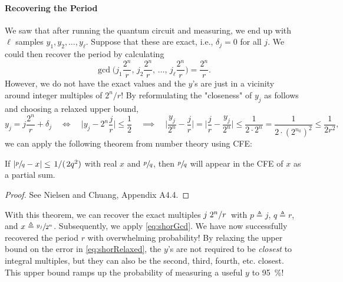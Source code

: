 				\paragraph{Recovering the Period}
					We saw that after running the quantum circuit and measuring, we end up with \(\ell\) samples \( y_1, y_2, \dots, y_\ell \). Suppose that these are exact, i.e., \( \delta_j = 0 \) for all \(j\). We could then recover the period by calculating
					\begin{equation}
						\gcd\biggl( j_1 \frac{2^n}{r},\, j_2 \frac{2^n}{r},\, \dots,\, j_\ell \frac{2^n}{r} \biggr) = \frac{2^n}{r}.  \label{eq:shorGcd}
					\end{equation}
					However, we do not have the exact values and the \(y\)'s are just in a vicinity around integer multiples of \(2^n/r\)! By reformulating the "closeness" of \(y_j\) as follows and choosing a relaxed upper bound,
					\begin{equation}
						y_j = j \frac{2^n}{r} + \delta_j
						\quad\iff\quad
						\biggl\lvert y_j - 2^n \frac{j}{r} \biggr\rvert \leq \frac{1}{2}
						\quad\implies\quad
						\biggl\lvert \frac{y_j}{2^n} - \frac{j}{r} \biggr\rvert = \biggl\lvert \frac{j}{r} - \frac{y_j}{2^n} \biggr\rvert \leq \frac{1}{2 \cdot 2^n} = \frac{1}{2 \cdot (2^{n_0})^2} \leq \frac{1}{2 r^2},
						\label{eq:shorRelaxed}
					\end{equation}
					we can apply the following theorem from number theory using \acl{CFE}:
					\begin{theorem}  \label{th:numberTheory}
						If \( \lvert \sfrac{p}{q} - x \rvert \leq \flatfrac{1}(\!2 q^2) \) with real \(x\) and \(\sfrac{p}{q}\), then \(\sfrac{p}{q}\) will appear in the \ac{CFE} of \(x\) as a partial sum.
					\end{theorem}
					\begin{proof}
						See Nielsen and Chuang, Appendix A4.4.
					\end{proof}

					With this theorem, we can recover the exact multiples \( j \flatfrac{2^n} r \) with \( p \triangleq j \), \( q \triangleq r \), and \( x \triangleq \sfrac{y_j}{2^n} \). Subsequently, we apply \eqref{eq:shorGcd}. We have now successfully recovered the period \(r\) with overwhelming probability! By relaxing the upper bound on the error in \eqref{eq:shorRelaxed}, the \(y\)'s are not required to be \emph{closest} to integral multiples, but they can also be the second, third, fourth, etc. closest. This upper bound ramps up the probability of measuring a useful \(y\) to \SI{95}{\percent}!

